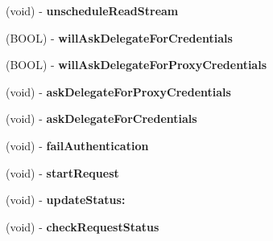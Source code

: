 \begin{DoxyCompactItemize}
\item 
\hypertarget{interface_a_s_i_h_t_t_p_request_07_08_a036ae593e23c948377acca2d405ab265}{
(void) -\/ {\bfseries unschedule\-Read\-Stream}}
\label{interface_a_s_i_h_t_t_p_request_07_08_a036ae593e23c948377acca2d405ab265}

\item 
\hypertarget{interface_a_s_i_h_t_t_p_request_07_08_a2fb19d10e5d6449c7845042add6dc2a1}{
(\-B\-O\-O\-L) -\/ {\bfseries will\-Ask\-Delegate\-For\-Credentials}}
\label{interface_a_s_i_h_t_t_p_request_07_08_a2fb19d10e5d6449c7845042add6dc2a1}

\item 
\hypertarget{interface_a_s_i_h_t_t_p_request_07_08_a52ecd8ea9d13c585c86a7f9031f1d2e8}{
(\-B\-O\-O\-L) -\/ {\bfseries will\-Ask\-Delegate\-For\-Proxy\-Credentials}}
\label{interface_a_s_i_h_t_t_p_request_07_08_a52ecd8ea9d13c585c86a7f9031f1d2e8}

\item 
\hypertarget{interface_a_s_i_h_t_t_p_request_07_08_a545869781fbd1e24ed126da754536006}{
(void) -\/ {\bfseries ask\-Delegate\-For\-Proxy\-Credentials}}
\label{interface_a_s_i_h_t_t_p_request_07_08_a545869781fbd1e24ed126da754536006}

\item 
\hypertarget{interface_a_s_i_h_t_t_p_request_07_08_a44501e22716b6373457e7f235775662c}{
(void) -\/ {\bfseries ask\-Delegate\-For\-Credentials}}
\label{interface_a_s_i_h_t_t_p_request_07_08_a44501e22716b6373457e7f235775662c}

\item 
\hypertarget{interface_a_s_i_h_t_t_p_request_07_08_aa65e69f36b090b963669094ce4e3ba31}{
(void) -\/ {\bfseries fail\-Authentication}}
\label{interface_a_s_i_h_t_t_p_request_07_08_aa65e69f36b090b963669094ce4e3ba31}

\item 
\hypertarget{interface_a_s_i_h_t_t_p_request_07_08_ae64756aed5b2103d48f7a10c04916c60}{
(void) -\/ {\bfseries start\-Request}}
\label{interface_a_s_i_h_t_t_p_request_07_08_ae64756aed5b2103d48f7a10c04916c60}

\item 
\hypertarget{interface_a_s_i_h_t_t_p_request_07_08_ab0847444e15b9b0263c5bedd8faa151a}{
(void) -\/ {\bfseries update\-Status\-:}}
\label{interface_a_s_i_h_t_t_p_request_07_08_ab0847444e15b9b0263c5bedd8faa151a}

\item 
\hypertarget{interface_a_s_i_h_t_t_p_request_07_08_a068fc55ba6cb87ad880bded7fd78ab27}{
(void) -\/ {\bfseries check\-Request\-Status}}
\label{interface_a_s_i_h_t_t_p_request_07_08_a068fc55ba6cb87ad880bded7fd78ab27}


\end{DoxyCompactItemize}
